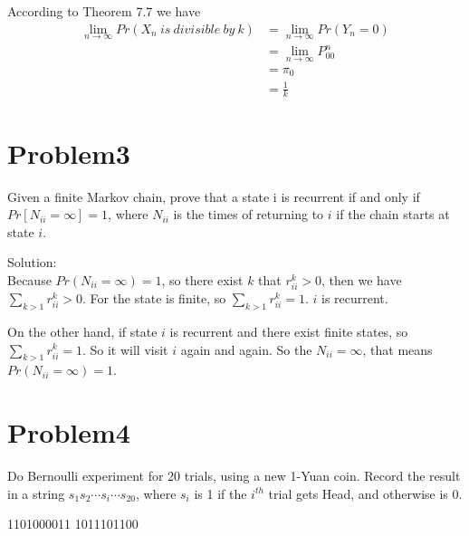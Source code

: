 \documentclass[12pt]{article}
\begin{document}
According to Theorem 7.7 we have
\begin{equation}
    \begin{split}
    \lim_{n \to \infty} Pr(X_n\ is\ divisible\ by\ k) &= \lim_{n \to \infty} Pr(Y_n = 0) \\
    &= \lim_{n \to \infty} P_{00}^n \\
    &= \pi_0\\
    &= \frac{1}{k}
    \end{split}
\end{equation}

\section{Problem3}
Given a finite Markov chain, prove that a state i is recurrent if and only if $Pr[N_{ii} = \infty] = 1$, where $N_{ii}$ is the times of returning to $i$ if the chain starts at state $i$.

Solution:\\
Because $Pr(N_{ii}=\infty)=1$, so there exist $k$ that $r_{ii}^k>0$, then we have $\sum_{k > 1} r_{ii}^k >0$. For the state is finite, so $\sum_{k>1} r_{ii}^k = 1$. $i$ is recurrent.

On the other hand, if state $i$ is recurrent and there exist finite states, so $\sum_{k>1} r_{ii}^k = 1$. So it will visit $i$ again and again. So the $N_{ii} = \infty$, that means $Pr(N_{ii}=\infty)=1$.

\section{Problem4}
Do Bernoulli experiment for 20 trials, using a new 1-Yuan coin. Record the result in a
string $s_1s_2 \cdots s_i \cdots s_{20}$, where $s_i$ is 1 if the $i^{th}$ trial gets Head, and otherwise is 0.

1101000011 1011101100
\end{document}
